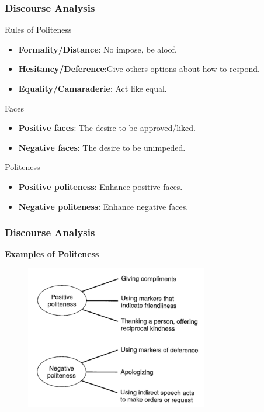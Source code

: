 \documentclass{beamer}
\begin{document}
\begin{frame}
\frametitle{Discourse Analysis}
\begin{block}{Rules of Politeness}
\begin{itemize}
\item \textbf{Formality/Distance}: No impose, be aloof.
\item \textbf{Hesitancy/Deference}:Give others options about how to respond.
\item \textbf{Equality/Camaraderie}: Act like equal.
\end{itemize}
\end{block}

\begin{block}{Faces}
\begin{itemize}
\item \textbf{Positive faces}: The desire to be approved/liked.
\item \textbf{Negative faces}: The desire to be unimpeded.
\end{itemize}
\end{block}

\begin{block}{Politeness}
\begin{itemize}
\item \textbf{Positive politeness}: Enhance positive faces.
\item \textbf{Negative politeness}: Enhance negative faces.
\end{itemize}
\end{block}
\end{frame}
\begin{frame}
\frametitle{Discourse Analysis}
\textbf{Examples of Politeness}
\begin{figure}[!htbp]
\center
\includegraphics[width=8cm]{polite.png}
\end{figure}
\end{frame}
\end{document}
